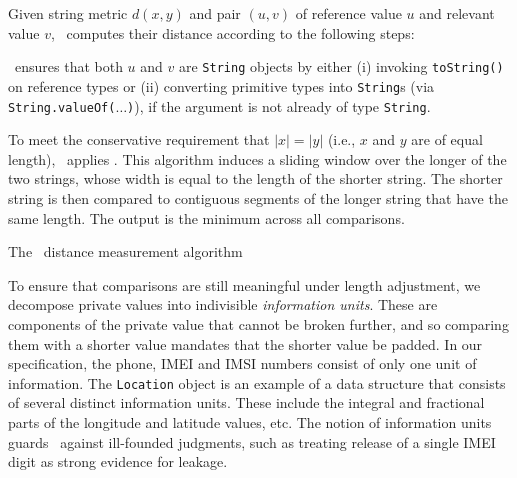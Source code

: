 Given string metric $d(x,y)$ and pair $(u,v)$ of reference value $u$ and relevant value $v$, \Tool\ computes their distance according to the following steps:
\begin{compactenum}
	\item \Tool\ ensures that both $u$ and $v$ are {\tt String} objects by either (i) invoking {\tt toString()} on reference types or (ii) converting primitive types into {\tt String}s
	(via {\tt String.valueOf($\ldots$)}), if
	the argument is not already of type {\tt String}.
	\item To meet the conservative requirement that $|x|=|y|$ (i.e., $x$ and $y$ are of equal length), \Tool\ applies . This algorithm induces a sliding window over the longer of the two strings, whose width is equal to the length of the shorter string. The shorter string is then compared to contiguous segments of the longer string that have the same length. The output is the minimum across all comparisons.
\end{compactenum}


\begin{algorithm}[t]
\begin{small}
\DontPrintSemicolon
{}
\BlankLine
{}
\end{small}
\caption{\label{Al:normalized}The \Tool\ distance measurement algorithm}
\end{algorithm}

To ensure that comparisons are still meaningful under length adjustment, we decompose private values into indivisible \emph{information units}. These are components of the private value that cannot be broken further, and so comparing them with a shorter value mandates that the shorter value be padded. In our specification, the phone, IMEI and IMSI numbers consist of only one unit of information.
%
The {\tt Location} object is an example of a data structure that consists of several distinct information units. These include the integral and fractional parts of the longitude and latitude values, etc. 
%
The notion of information units guards \Tool\ against ill-founded judgments, such as treating release of a single IMEI digit as strong evidence for leakage.

